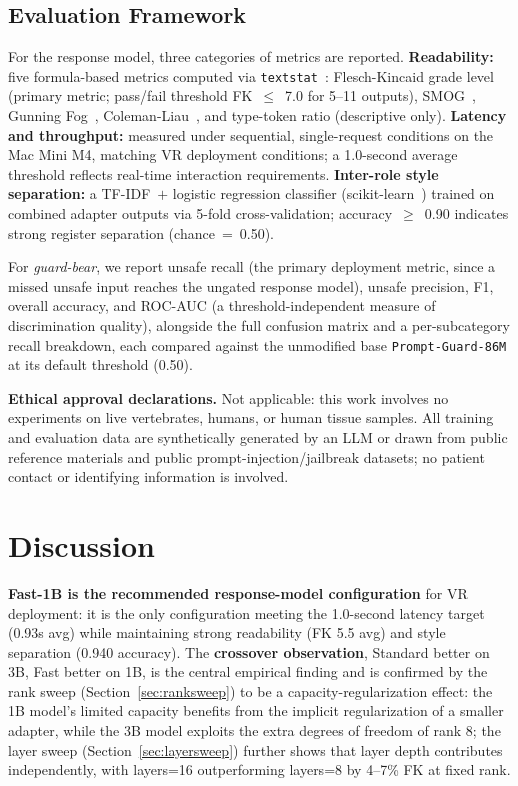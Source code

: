 \documentclass[pdflatex,sn-mathphys-num]{sn-jnl}%
\begin{document}
\subsection{Evaluation Framework}

For the response model, three categories of metrics are reported. \textbf{Readability:} five formula-based metrics computed via \texttt{textstat}~\cite{bansal2023textstat}: Flesch-Kincaid grade level~\cite{kincaid1975fk} (primary metric; pass/fail threshold FK~$\leq$~7.0 for 5--11 outputs), SMOG~\cite{mclaughlin1969smog}, Gunning Fog~\cite{gunning1952fog}, Coleman-Liau~\cite{coleman1975cli}, and type-token ratio (descriptive only). \textbf{Latency and throughput:} measured under sequential, single-request conditions on the Mac Mini M4, matching VR deployment conditions; a 1.0-second average threshold reflects real-time interaction requirements. \textbf{Inter-role style separation:} a TF-IDF~$+$ logistic regression classifier (scikit-learn~\cite{pedregosa2011sklearn}) trained on combined adapter outputs via 5-fold cross-validation; accuracy~$\geq$~0.90 indicates strong register separation (chance~=~0.50).

For \textit{guard-bear}, we report unsafe recall (the primary deployment metric, since a missed unsafe input reaches the ungated response model), unsafe precision, F1, overall accuracy, and ROC-AUC (a threshold-independent measure of discrimination quality), alongside the full confusion matrix and a per-subcategory recall breakdown, each compared against the unmodified base \texttt{Prompt-Guard-86M} at its default threshold (0.50).

\textbf{Ethical approval declarations.} Not applicable: this work involves no experiments on live vertebrates, humans, or human tissue samples. All training and evaluation data are synthetically generated by an LLM or drawn from public reference materials and public prompt-injection/jailbreak datasets; no patient contact or identifying information is involved.

\section{Discussion}\label{sec:discussion}

\textbf{Fast-1B is the recommended response-model configuration} for VR deployment: it is the only configuration meeting the 1.0-second latency target (0.93s avg) while maintaining strong readability (FK 5.5 avg) and style separation (0.940 accuracy). The \textbf{crossover observation}, Standard better on 3B, Fast better on 1B, is the central empirical finding and is confirmed by the rank sweep (Section~\ref{sec:ranksweep}) to be a capacity-regularization effect: the 1B model's limited capacity benefits from the implicit regularization of a smaller adapter, while the 3B model exploits the extra degrees of freedom of rank 8; the layer sweep (Section~\ref{sec:layersweep}) further shows that layer depth contributes independently, with layers=16 outperforming layers=8 by 4--7\% FK at fixed rank.
\end{document}
